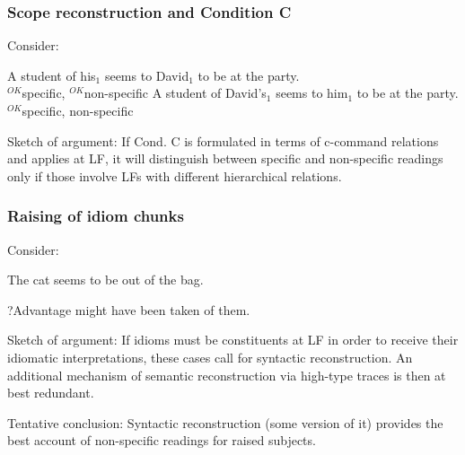 \subsubsection{Scope reconstruction and Condition C}

Consider:

\pex
\a A student of his$_{1}$ seems to David$_1$ to be at the party.\\
\null\hfill $^{OK}$specific, $^{OK}$non-specific 
\a A student of David's$_{1}$ seems to him$_{1}$ to be at the party.\\
\null\hfill $^{OK}$specific, {\small *}non-specific
\xe

Sketch of argument: If Cond. C is formulated in terms of c-command relations and
applies at LF, it will distinguish between specific and non-specific readings
only if those involve LFs with different hierarchical relations.

\subsubsection{Raising of idiom chunks}

Consider:

\ex The cat seems to be out of the bag. \xe

\ex ?Advantage might have been taken of them. \xe

Sketch of argument: If idioms must be constituents at LF in order to receive
their idiomatic interpretations, these cases call for syntactic reconstruction.
An additional mechanism of semantic reconstruction via high-type traces is then
at best redundant.

\medskip\noindent Tentative conclusion: Syntactic reconstruction (some version
of it) provides the best account of non-specific readings for raised subjects.



